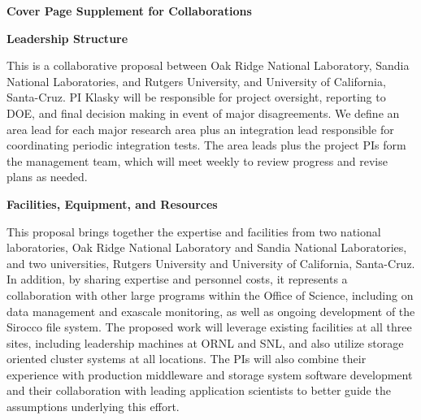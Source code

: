 \newpage

\begin{center}
\textbf{\huge Cover Page Supplement for Collaborations}
\end{center}



%
\begin{center}
\textbf{\large Leadership Structure}
\end{center}


This is a collaborative proposal between 
Oak Ridge National Laboratory,
Sandia National Laboratories, and
Rutgers University, and
University of California, Santa-Cruz. 
PI Klasky will be responsible for project oversight, reporting to DOE, and
final decision making in event of major disagreements.
We define an area lead for each major research area plus
an integration lead responsible for coordinating periodic integration tests. The area leads plus the project PIs
form the management team, which will meet weekly to review progress and revise plans as needed.




\begin{center}
\textbf{\large Facilities, Equipment, and Resources}
\end{center}
This proposal brings together the expertise and facilities from two
national laboratories, Oak Ridge National Laboratory and Sandia National
Laboratories, and two universities, Rutgers University and University of
California, Santa-Cruz. 
 In addition, by
sharing expertise and personnel costs, it represents
a collaboration with other large programs within the Office of
Science, including on data management and exascale monitoring, as well as
ongoing development of the Sirocco file system. 
The proposed work will leverage existing facilities at all three
sites, including leadership machines at ORNL and SNL, and also utilize
storage oriented cluster systems at all locations. The PIs will also combine
their experience with production middleware and storage system software
development and their collaboration with leading application scientists to
better guide the assumptions underlying this effort. 

